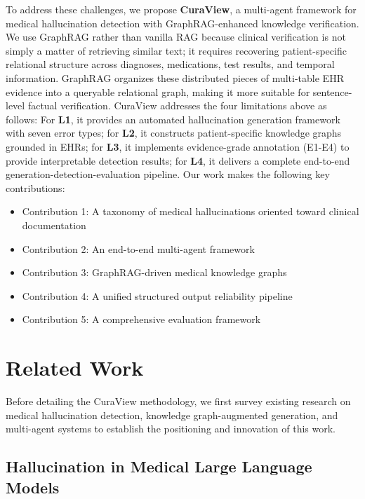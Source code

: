 \documentclass[11pt]{article}
\providecommand{\tightlist}{\setlength{\itemsep}{0pt}\setlength{\parskip}{0pt}}
\begin{document}
To address these challenges, we propose \textbf{CuraView}, a multi-agent framework for medical hallucination detection with GraphRAG-enhanced knowledge verification. We use GraphRAG rather than vanilla RAG because clinical verification is not simply a matter of retrieving similar text; it requires recovering patient-specific relational structure across diagnoses, medications, test results, and temporal information. GraphRAG organizes these distributed pieces of multi-table EHR evidence into a queryable relational graph, making it more suitable for sentence-level factual verification. CuraView addresses the four limitations above as follows: For \textbf{L1}, it provides an automated hallucination generation framework with seven error types; for \textbf{L2}, it constructs patient-specific knowledge graphs grounded in EHRs; for \textbf{L3}, it implements evidence-grade annotation (E1-E4) to provide interpretable detection results; for \textbf{L4}, it delivers a complete end-to-end generation-detection-evaluation pipeline. Our work makes the following key contributions:

\begin{itemize}
\tightlist
\item
  Contribution 1: A taxonomy of medical hallucinations oriented toward clinical documentation
\item
  Contribution 2: An end-to-end multi-agent framework
\item
  Contribution 3: GraphRAG-driven medical knowledge graphs
\item
  Contribution 4: A unified structured output reliability pipeline
\item
  Contribution 5: A comprehensive evaluation framework
\end{itemize}

\section{Related Work}
Before detailing the CuraView methodology, we first survey existing research on medical hallucination detection, knowledge graph-augmented generation, and multi-agent systems to establish the positioning and innovation of this work.

\subsection{Hallucination in Medical Large Language Models}
\end{document}
